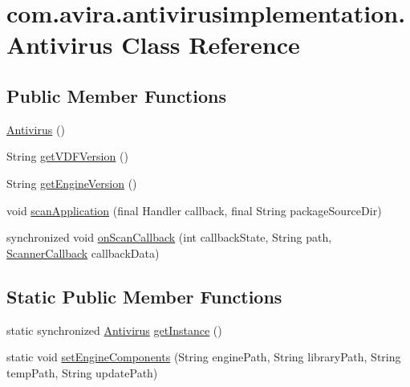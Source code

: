 \hypertarget{classcom_1_1avira_1_1antivirusimplementation_1_1_antivirus}{}\section{com.\+avira.\+antivirusimplementation.\+Antivirus Class Reference}
\label{classcom_1_1avira_1_1antivirusimplementation_1_1_antivirus}
\subsection*{Public Member Functions}
\begin{DoxyCompactItemize}
\item 
\hyperlink{classcom_1_1avira_1_1antivirusimplementation_1_1_antivirus_a01065f9ba50e068c7741f15fbb622e8b}{Antivirus} ()
\item 
String \hyperlink{classcom_1_1avira_1_1antivirusimplementation_1_1_antivirus_a5c9dfcff4513f30c3e252e1c280bd2ea}{get\+V\+D\+F\+Version} ()
\item 
String \hyperlink{classcom_1_1avira_1_1antivirusimplementation_1_1_antivirus_abbe374ed44caa0a2bbc33accd6bfd612}{get\+Engine\+Version} ()
\item 
void \hyperlink{classcom_1_1avira_1_1antivirusimplementation_1_1_antivirus_aa462dddafab4128e14e175f37ef9a217}{scan\+Application} (final Handler callback, final String package\+Source\+Dir)
\item 
synchronized void \hyperlink{classcom_1_1avira_1_1antivirusimplementation_1_1_antivirus_a34018fa89db3ada6e3156c2d1ed4e2ab}{on\+Scan\+Callback} (int callback\+State, String path, \hyperlink{classcom_1_1avira_1_1antivirusimplementation_1_1_scanner_callback}{Scanner\+Callback} callback\+Data)
\end{DoxyCompactItemize}
\subsection*{Static Public Member Functions}
\begin{DoxyCompactItemize}
\item 
static synchronized \hyperlink{classcom_1_1avira_1_1antivirusimplementation_1_1_antivirus}{Antivirus} \hyperlink{classcom_1_1avira_1_1antivirusimplementation_1_1_antivirus_ac4856ca2a124af9b42865b88f43250c0}{get\+Instance} ()
\item 
static void \hyperlink{classcom_1_1avira_1_1antivirusimplementation_1_1_antivirus_a3542316916ff74da0937558a1b3aa85b}{set\+Engine\+Components} (String engine\+Path, String library\+Path, String temp\+Path, String update\+Path)
\end{DoxyCompactItemize}
